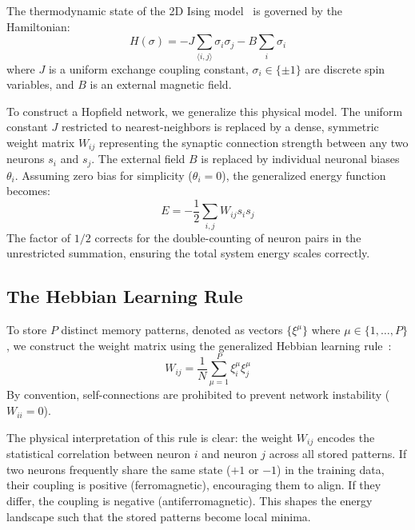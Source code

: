 \documentclass[11pt,a4paper,twocolumn]{article}
\begin{document}
The thermodynamic state of the 2D Ising model~\cite{ising1925} is governed by
the Hamiltonian:
\begin{equation}
H(\sigma) = -J \sum_{\langle i,j \rangle} \sigma_i \sigma_j
             - B \sum_{i} \sigma_i
\label{eq:ising_hamiltonian}
\end{equation}
where $J$ is a uniform exchange coupling constant,
$\sigma_i \in \{\pm 1\}$ are discrete spin variables, and $B$ is an external
magnetic field.

To construct a Hopfield network, we generalize this physical model. The
uniform constant $J$ restricted to nearest-neighbors is replaced by a dense,
symmetric weight matrix $W_{ij}$ representing the synaptic connection strength
between any two neurons $s_i$ and $s_j$. The external field $B$ is replaced by
individual neuronal biases $\theta_i$. Assuming zero bias for simplicity
($\theta_i = 0$), the generalized energy function becomes:
\begin{equation}
E = -\frac{1}{2}\sum_{i,j} W_{ij} s_i s_j
\label{eq:hopfield_energy}
\end{equation}
The factor of $1/2$ corrects for the double-counting of neuron pairs in the
unrestricted summation, ensuring the total system energy scales correctly.

\subsection{The Hebbian Learning Rule}
\label{sec:hebbian}

To store $P$ distinct memory patterns, denoted as vectors $\{\xi^\mu\}$ where
$\mu \in \{1, \dots, P\}$, we construct the weight matrix using the
generalized Hebbian learning rule~\cite{hebb1949}:
\begin{equation}
W_{ij} = \frac{1}{N} \sum_{\mu=1}^{P} \xi_i^\mu \xi_j^\mu
\label{eq:hebbian}
\end{equation}
By convention, self-connections are prohibited to prevent network instability
($W_{ii} = 0$).

The physical interpretation of this rule is clear: the weight $W_{ij}$ encodes
the statistical correlation between neuron $i$ and neuron $j$ across all
stored patterns. If two neurons frequently share the same state ($+1$ or
$-1$) in the training data, their coupling is positive (ferromagnetic),
encouraging them to align. If they differ, the coupling is negative
(antiferromagnetic). This shapes the energy landscape such that the stored
patterns become local minima.
\end{document}
